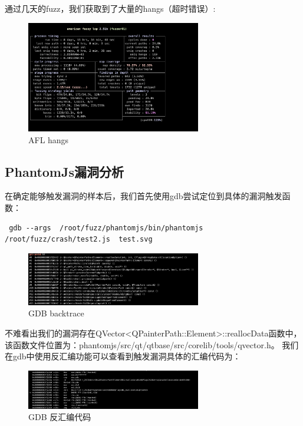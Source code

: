\documentclass[doctor,privacy,twoside]{buaa_mac}
\begin{document}
通过几天的fuzz，我们获取到了大量的hangs（超时错误）:

\centerline{}
\begin{figure}[!h]
  \centering
  \includegraphics[width=0.68\textwidth]{images/afl_hangs.png}
  \caption{AFL hangs}
  \label{fig:logo}
\end{figure}
\centerline{}


\subsection{PhantomJs漏洞分析}

在确定能够触发漏洞的样本后，我们首先使用gdb尝试定位到具体的漏洞触发函数：

\lstset{language=JavaScript}
\begin{lstlisting}
 gdb --args  /root/fuzz/phantomjs/bin/phantomjs /root/fuzz/crash/test2.js  test.svg 
 \end{lstlisting}
 
\centerline{}
\begin{figure}[!h]
  \centering
  \includegraphics[width=0.68\textwidth]{images/gdb_backtrace.png}
  \caption{GDB backtrace}
  \label{fig:logo}
\end{figure}
\centerline{}
 
 不难看出我们的漏洞存在QVector<QPainterPath::Element>::reallocData函数中，该函数文件位置为：phantomjs/src/qt/qtbase/src/corelib/tools/qvector.h。 我们在gdb中使用反汇编功能可以查看到触发漏洞具体的汇编代码为：
 
 \centerline{}
\begin{figure}[!h]
  \centering
  \includegraphics[width=0.68\textwidth]{images/gdb_disassemble.png}
  \caption{GDB 反汇编代码}
  \label{fig:logo}
\end{figure}
\centerline{}
 
\end{document}
